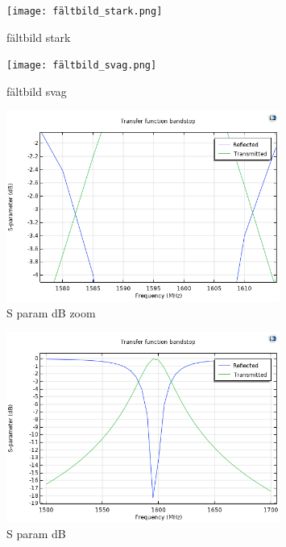 \documentclass[a4paper]{article}
\begin{document}
\begin{figure}[h]
	\centering
	\texttt{[image: fältbild\_stark.png]}
	\caption{fältbild stark}
	\label{fig:stark}
\end{figure}

\begin{figure}[h]
	\centering
	\texttt{[image: fältbild\_svag.png]}
	\caption{fältbild svag}
	\label{fig:svag}
\end{figure}

\begin{figure}[h]
	\centering
	\includegraphics[width=0.8\textwidth]{reflect_transmit_dB_zoom.png}
	\caption{S param dB zoom}
	\label{fig:rtzoom}
\end{figure}

\begin{figure}[h]
	\centering
	\includegraphics[width=0.8\textwidth]{reflect_transmit_dB.png}
	\caption{S param dB}
	\label{fig:rt}
\end{figure}
\end{document}
